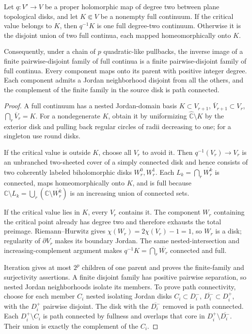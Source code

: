 \begin{lemma}\label{lem:finite-full-pullbacks}
Let \(q:V'\to V\) be a proper holomorphic map of degree two between plane topological disks, and let \(K\Subset V\) be a nonempty full continuum. If the critical value belongs to \(K\), then \(q^{-1}K\) is one full degree-two continuum. Otherwise it is the disjoint union of two full continua, each mapped homeomorphically onto \(K\).

Consequently, under a chain of \(p\) quadratic-like pullbacks, the inverse image of a finite pairwise-disjoint family of full continua is a finite pairwise-disjoint family of full continua. Every component maps onto its parent with positive integer degree. Each component admits a Jordan neighborhood disjoint from all the others, and the complement of the finite family in the source disk is path connected.
\end{lemma}

\begin{proof}
A full continuum has a nested Jordan-domain basis \(K\subset V_{r+1}\), \(\overline V_{r+1}\subset V_r\), \(\bigcap_r\overline V_r=K\). For a nondegenerate \(K\), obtain it by uniformizing \(\hat{\mathbb C}\setminus K\) by the exterior disk and pulling back regular circles of radii decreasing to one; for a singleton use round disks.

If the critical value is outside \(K\), choose all \(V_r\) to avoid it. Then \(q^{-1}(V_r)\to V_r\) is an unbranched two-sheeted cover of a simply connected disk and hence consists of two coherently labeled biholomorphic disks \(W_r^0,W_r^1\). Each \(L_k=\bigcap_r\overline{W_r^k}\) is connected, maps homeomorphically onto \(K\), and is full because \(\mathbb C\setminus L_k=\bigcup_r(\mathbb C\setminus\overline{W_r^k})\) is an increasing union of connected sets.

If the critical value lies in \(K\), every \(V_r\) contains it. The component \(W_r\) containing the critical point already has degree two and therefore exhausts the total preimage. Riemann--Hurwitz gives \(\chi(W_r)=2\chi(V_r)-1=1\), so \(W_r\) is a disk; regularity of \(\partial V_r\) makes its boundary Jordan. The same nested-intersection and increasing-complement argument makes \(q^{-1}K=\bigcap_r\overline{W_r}\) connected and full.

Iteration gives at most \(2^p\) children of one parent and proves the finite-family and surjectivity assertions. A finite disjoint family has positive pairwise separation, so nested Jordan neighborhoods isolate its members. To prove path connectivity, choose for each member \(C_i\) nested isolating Jordan disks \(C_i\subset D_i^-\), \(\overline{D_i^-}\subset D_i^+\), with the \(D_i^+\) pairwise disjoint. The disk with the \(\overline{D_i^-}\) removed is path connected. Each \(D_i^+\setminus C_i\) is path connected by fullness and overlaps that core in \(D_i^+\setminus\overline{D_i^-}\). Their union is exactly the complement of the \(C_i\).
\end{proof}